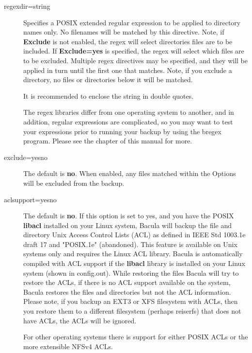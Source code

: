 \begin{description}
\item [regexdir=\lt{}string\gt{}]
   Specifies a POSIX extended regular expression to be applied to directory
   names only.  No filenames will be matched by this directive.  Note, if
   {\bf Exclude} is not enabled, the regex will select directories
   files are to be included.  If {\bf Exclude=yes} is specified, the
   regex will select which files are to be excluded.  Multiple
   regex directives may be specified, and they will be applied in turn
   until the first one that matches.  Note, if you exclude a directory, no
   files or directories below it will be matched.

   It is recommended to enclose the string in double quotes.

   The regex libraries differ from one operating system to
   another, and in addition, regular expressions are complicated,
   so you may want to test your expressions prior to running your
   backup by using the bregex program. Please see the
    chapter of this manual for
   more.


\item [exclude=yes\vb{}no]
   The default is {\bf no}.  When enabled, any files matched within the
   Options will be excluded from the backup.

\label{ACLSupport}
\item [aclsupport=yes\vb{}no]
   The default is {\bf no}.  If this option is set to yes, and you have the
   POSIX {\bf libacl} installed on your Linux system, Bacula will backup the
   file and directory Unix Access Control Lists (ACL) as defined in IEEE Std
   1003.1e draft 17 and "POSIX.1e" (abandoned).  This feature is
   available on Unix systems only and requires the Linux ACL library. Bacula is
   automatically compiled with ACL support if the {\bf libacl} library is
   installed on your Linux system (shown in config.out).  While restoring the
   files Bacula will try to restore the ACLs, if there is no ACL support
   available on the system, Bacula restores the files and directories but
   not the ACL information.  Please note, if you backup an EXT3 or XFS
   filesystem with ACLs, then you restore them to a different filesystem
   (perhaps reiserfs) that does not have ACLs, the ACLs will be ignored.

   For other operating systems there is support for either POSIX ACLs or
   the more extensible NFSv4 ACLs.


\end{description}

